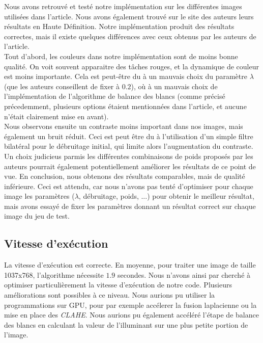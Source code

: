 \documentclass[twoside]{article}
\begin{document}
Nous avons retrouvé et testé notre implémentation sur les différentes images utilisées dans l'article. Nous avons également trouvé sur le site des auteurs leurs résultats en Haute Définition. Notre implémentation produit des résultats correctes, mais il existe quelques différences avec ceux obtenus par les auteurs de l'article. \\
Tout d'abord, les couleurs dans notre implémentation sont de moins bonne qualité. On voit souvent apparaitre des tâches rouges, et la dynamique de couleur est moins importante. Cela est peut-être du à un mauvais choix du paramètre $\lambda$ (que les auteurs conseillent de fixer à $0.2$), où à un mauvais choix de l'implémentation de l'algorithme de balance des blancs (comme précisé précedemment, plusieurs options étaient mentionnées dans l'article, et aucune n'était clairement mise en avant).\\
Nous observons ensuite un contraste moins important dans nos images, mais également un bruit réduit. Ceci est peut être du à l'utilisation d'un simple filtre bilatéral pour le débruitage initial, qui limite alors l'augmentation du contraste. Un choix judicieus parmis les différentes combinaisons de poids proposés par les auteurs pourrait également potentiellement améliorer les résultats de ce point de vue.
En conclusion, nous obtenons des résultats comparables, mais de qualité inférieure. Ceci est attendu, car nous n'avons pas tenté d'optimiser pour chaque image les paramètres ($\lambda$, débruitage, poids, ...) pour obtenir le meilleur résultat, mais avons essayé de fixer les paramètres donnant un résultat correct sur chaque image du jeu de test.

\subsection{Vitesse d'exécution}
La vitesse d'exécution est correcte. En moyenne, pour traiter une image de taille 1037x768, l'algorithme nécessite $1.9$ secondes. Nous n'avons ainsi par cherché à optimiser particulièrement la vitesse d'exécution de notre code. Plusieurs améliorations sont possibles à ce niveau. Nous aurions pu utiliser la programmations sur GPU, pour par exemple accélerer la fusion laplacienne ou la mise en place des \emph{CLAHE}. Nous aurions pu également accéléré l'étape de balance des blancs en calculant la valeur de l'illuminant sur une plus petite portion de l'image.

\end{document}
